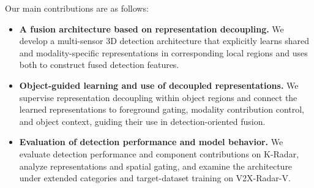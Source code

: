 Our main contributions are as follows:
\begin{itemize}
    \item \textbf{A fusion architecture based on representation decoupling.}
    We develop a multi-sensor 3D detection architecture that explicitly learns shared and modality-specific representations in corresponding local regions and uses both to construct fused detection features.
    \item \textbf{Object-guided learning and use of decoupled representations.}
    We supervise representation decoupling within object regions and connect the learned representations to foreground gating, modality contribution control, and object context, guiding their use in detection-oriented fusion.
    \item \textbf{Evaluation of detection performance and model behavior.}
    We evaluate detection performance and component contributions on K-Radar, analyze representations and spatial gating, and examine the architecture under extended categories and target-dataset training on V2X-Radar-V.
\end{itemize}
